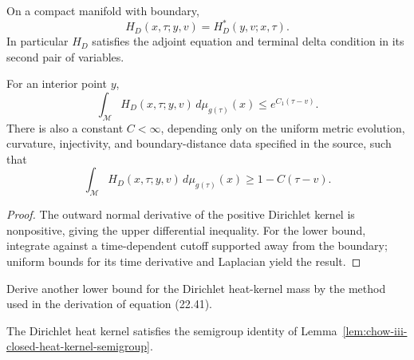 \begin{lemma}
\label{lem:chow-iii-dirichlet-heat-adjoint-symmetry}
On a compact manifold with boundary,
\[
 H_D(x,\tau;y,v)=H_D^*(y,v;x,\tau).
\]
In particular \(H_D\) satisfies the adjoint equation and terminal delta
condition in its second pair of variables.
\end{lemma}

\begin{lemma}
\label{lem:chow-iii-dirichlet-heat-kernel-mass-bounds}
For an interior point \(y\),
\[
 \int_{\mathcal M}H_D(x,\tau;y,v)\,d\mu_{g(\tau)}(x)
 \le e^{C_1(\tau-v)}.
\]
There is also a constant \(C<\infty\), depending only on the uniform metric
evolution, curvature, injectivity, and boundary-distance data specified in
the source, such that
\[
 \int_{\mathcal M}H_D(x,\tau;y,v)\,d\mu_{g(\tau)}(x)
 \ge 1-C(\tau-v).
\]
\end{lemma}
\begin{proof}
\sketch The outward normal derivative of the positive Dirichlet kernel is
nonpositive, giving the upper differential inequality.  For the lower bound,
integrate against a time-dependent cutoff supported away from the boundary;
uniform bounds for its time derivative and Laplacian yield the result.
\end{proof}

\begin{claim}
\label{clm:chow-iii-dirichlet-mass-lower-bound-exercise}
Derive another lower bound for the Dirichlet heat-kernel mass by the method
used in the derivation of equation (22.41).
\end{claim}

\begin{lemma}
\label{lem:chow-iii-dirichlet-heat-kernel-semigroup}
The Dirichlet heat kernel satisfies the semigroup identity of
Lemma~\ref{lem:chow-iii-closed-heat-kernel-semigroup}.
\end{lemma}

